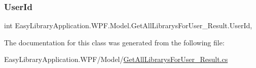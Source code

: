 \subsubsection{\texorpdfstring{User\+Id}{UserId}}
{\footnotesize\ttfamily int Easy\+Library\+Application.\+W\+P\+F.\+Model.\+Get\+All\+Librarys\+For\+User\+\_\+\+Result.\+User\+Id\hspace{0.3cm}{\ttfamily [get]}, {\ttfamily [set]}}



The documentation for this class was generated from the following file\+:\begin{DoxyCompactItemize}
\item 
Easy\+Library\+Application.\+W\+P\+F/\+Model/\mbox{\hyperlink{_get_all_librarys_for_user___result_8cs}{Get\+All\+Librarys\+For\+User\+\_\+\+Result.\+cs}}\end{DoxyCompactItemize}
